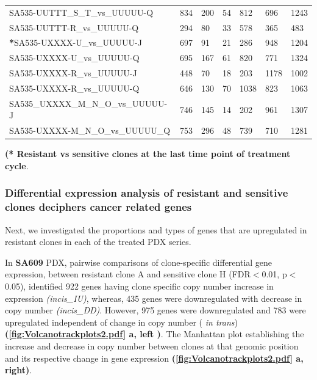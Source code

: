 \begin{landscape}
\begin{table}
{\begin{tabular}{|l|p{3.8em}|p{3.8em}|p{3.8em}|p{3.8em}|p{3.8em}|p{3.8em}|}
SA535-UUTTT\_S\_T\_vs\_UUUUU-Q     & 834 & 200 & 54  & 812  & 696  & 1243 \\
SA535-UUTTT-R\_vs\_UUUUU-Q         & 294 & 80  & 33  & 578  & 365  & 483  \\
\textbf{*}SA535-UXXXX-U\_vs\_UUUUU-J         & 697 & 91  & 21  & 286  & 948  & 1204 \\
SA535-UXXXX-U\_vs\_UUUUU-Q         & 695 & 167 & 61  & 820  & 771  & 1324 \\
SA535-UXXXX-R\_vs\_UUUUU-J         & 448 & 70  & 18  & 203  & 1178 & 1002 \\
SA535-UXXXX-R\_vs\_UUUUU-Q         & 646 & 130 & 70  & 1038 & 823  & 1063 \\
SA535\_UXXXX\_M\_N\_O\_vs\_UUUUU-J & 746 & 145 & 14  & 202  & 961  & 1307 \\
SA535-UXXXX-M\_N\_O\_vs\_UUUUU\_Q  & 753 & 296 & 48  & 739  & 710  & 1281 \\
  \hline

\end{tabular}
}

\label{tab:numberofDEgenesincistrans}

  \small\textbf{(* Resistant vs sensitive clones at the last time point of treatment cycle}.
\end{table}
\end{landscape}


 \subsubsection{Differential expression analysis of resistant and sensitive clones deciphers cancer related genes}
 Next, we investigated the proportions and types of genes that are upregulated in resistant clones in each of the treated PDX series.
 
 In \textbf{SA609} PDX, pairwise comparisons of clone-specific differential gene expression, between resistant clone A and sensitive clone H (FDR$<$0.01, p$<$0.05), identified 922 genes having clone specific copy number increase in expression \textit{(incis\_IU)}, whereas, 435 genes were downregulated with decrease in copy number \textit{(incis\_DD)}. However, 975 genes were downregulated and 783 were upregulated independent of change in copy number ( \textit{in trans}) \textbf{(\autoref{fig:Volcanotrackplots2.pdf} a, left )}. The Manhattan plot establishing the increase and decrease in copy number between clones at that genomic position and its respective change in gene expression \textbf{(\autoref{fig:Volcanotrackplots2.pdf} a, right)}.
 
